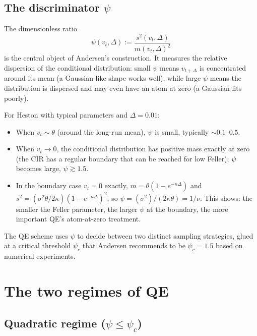 \documentclass[11pt]{article}
\theoremstyle{plain}
\theoremstyle{definition}
\theoremstyle{remark}
\begin{document}
\subsection{The discriminator $\psi$}

The dimensionless ratio
\begin{equation}
    \psi(v_t, \Delta) := \frac{s^2(v_t, \Delta)}{m(v_t, \Delta)^2}                                                          \label{eq:psi-def}
\end{equation}
is the central object of Andersen's construction. It measures the relative dispersion of the conditional distribution: small $\psi$ means $v_{t+\Delta}$ is concentrated around its mean (a Gaussian-like shape works well), while large $\psi$ means the distribution is dispersed and may even have an atom at zero (a Gaussian fits poorly).

For Heston with typical parameters and $\Delta = 0.01$:
\begin{itemize}[topsep=2pt]
    \item When $v_t \sim \theta$ (around the long-run mean), $\psi$ is small, typically $\sim 0.1$--$0.5$.
    \item When $v_t \to 0$, the conditional distribution has positive mass exactly at zero (the CIR has a regular boundary that can be reached for low Feller); $\psi$ becomes large, $\psi \gtrsim 1.5$.
    \item In the boundary case $v_t = 0$ exactly, $m = \theta(1 - e^{-\kappa\Delta})$ and $s^2 = (\sigma^2 \theta / 2\kappa)(1 - e^{-\kappa\Delta})^2$, so $\psi = (\sigma^2)/(2\kappa\theta) = 1/\nu$. This shows: the smaller the Feller parameter, the larger $\psi$ at the boundary, the more important QE's atom-at-zero treatment.
\end{itemize}

The QE scheme uses $\psi$ to decide between two distinct sampling strategies, glued at a critical threshold $\psi_c$ that Andersen recommends to be $\psi_c = 1.5$ based on numerical experiments.

\section{The two regimes of QE}

\subsection{Quadratic regime ($\psi \leq \psi_c$)}
\end{document}
